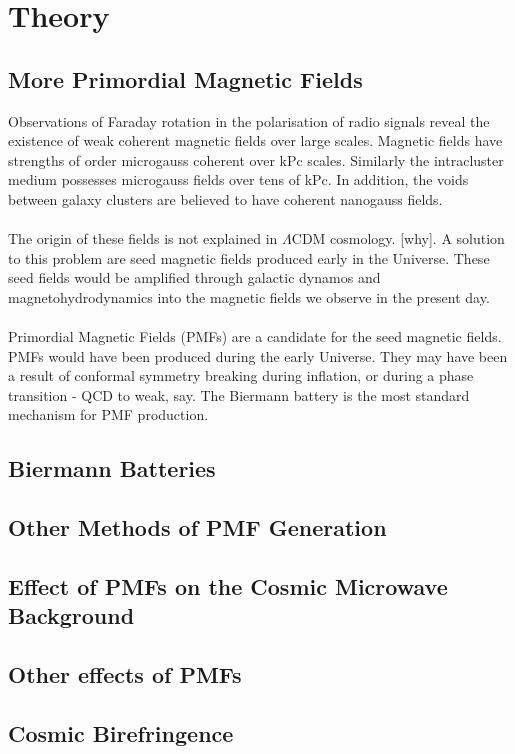 \section{Theory}

\subsection{More Primordial Magnetic Fields}
Observations of Faraday rotation in the polarisation of radio signals reveal the existence of weak coherent magnetic fields over large scales. Magnetic fields have strengths of order microgauss coherent over kPc scales. Similarly the intracluster medium possesses microgauss fields over tens of kPc. In addition, the voids between galaxy clusters are believed to have coherent nanogauss fields.
\\\\
The origin of these fields is not explained in $\Lambda$CDM cosmology. [why]. A solution to this problem are seed magnetic fields produced early in the Universe. These seed fields would be amplified through galactic dynamos and magnetohydrodynamics into the magnetic fields we observe in the present day.
\\\\
Primordial Magnetic Fields (PMFs) are a candidate for the seed magnetic fields. PMFs would have been produced during the early Universe. They may have been a result of conformal symmetry breaking during inflation, or during a phase transition - QCD to weak, say. The Biermann battery is the most standard mechanism for PMF production.

\subsection{Biermann Batteries}
\subsection{Other Methods of PMF Generation}
\subsection{Effect of PMFs on the Cosmic Microwave Background}
\subsection{Other effects of PMFs}
\subsection{Cosmic Birefringence}

